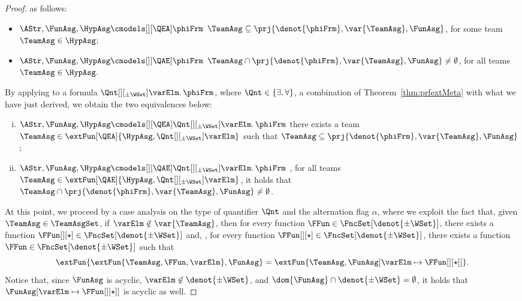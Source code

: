 \documentclass[authoryear]{elsarticle}
\newcommand{\EmpTeamAsg}{\emptyset}
\begin{document}
\begin{proof}
  as follows:
  \begin{itemize}[$\bullet$]
  \item
    $\AStr, \FunAsg, \HypAsg \cmodels[][\QEA] \phiFrm$ \iff $\TeamAsg \subseteq
    \prj{\denot{\phiFrm}, \var{\TeamAsg}, \FunAsg}$, for
    some team $\TeamAsg \in \HypAsg$;
  \item
    $\AStr, \FunAsg, \HypAsg \cmodels[][\QAE] \phiFrm$ \iff $\TeamAsg \cap
    \prj{\denot{\phiFrm}, \var{\TeamAsg}, \FunAsg} \neq
    \EmpTeamAsg$, for all teams $\TeamAsg \in \HypAsg$.
  \end{itemize}
%
    By applying to a formula $\Qnt[][_{\pm\WSet}] \varElm \ldotp \phiFrm$, where
    $\Qnt \in \{ \exists, \forall \}$, a combination of
    Theorem~\ref{thm:prfextMeta} with what we have just derived, we obtain the
    two equivalences below:
  \begin{enumerate}[i)]
  \item\label{thm:qntint(qnt:ea)}
    $\AStr, \FunAsg, \HypAsg \cmodels[][\QEA] \Qnt[][_{\pm\WSet}] \varElm \ldotp
    \phiFrm$ \iff there exists a team $\TeamAsg \in \extFun[\QEA]{\HypAsg,
      \Qnt[][_{\pm\WSet}] \varElm}$ such that $\TeamAsg \subseteq
    \prj{\denot{\phiFrm}, \var{\TeamAsg}, \FunAsg}$;
  \item\label{thm:qntint(qnt:ae)}
    $\AStr, \FunAsg, \HypAsg \cmodels[][\QAE] \Qnt[][_{\pm\WSet}] \varElm \ldotp
    \phiFrm$ \iff, for all teams $\TeamAsg \in \extFun[\QAE]{\HypAsg,
      \Qnt[][_{\pm\WSet}] \varElm}$, it holds that $\TeamAsg \cap
    \prj{\denot{\phiFrm}, \var{\TeamAsg}, \FunAsg} \neq \EmpTeamAsg$.
  \end{enumerate}
%
  At this point, we proceed by a case analysis on the type of quantifier $\Qnt$
  and the alternation flag $\alpha$, where we exploit the fact that, given
  $\TeamAsg \in \TeamAsgSet$,
%
%
  if
  $\varElm \notin \var{\TeamAsg}$, then for every function $\FFun \in
  \FncSet[\denot{\pm\WSet}]{}$, there exists a function $\FFun[][\star] \in
  \FncSet[\denot{\pm\WSet}]{}$ and, \viceversa, for every function
  $\FFun[][\star] \in \FncSet[\denot{\pm\WSet}]{}$, there exists a function
  $\FFun \in \FncSet[\denot{\pm\WSet}]{}$ such that
  \[
    \extFun{\extFun{\TeamAsg, \FFun, \varElm}, \FunAsg} = \extFun{\TeamAsg,
    {\FunAsg}[\varElm \mapsto \FFun[][\star]]}.
  \]
  Notice that, since $\FunAsg$ is acyclic, $\varElm \not\in \denot{\pm\WSet}$,
  and $\dom{\FunAsg} \cap \denot{\pm\WSet} = \emptyset$, it holds that
  ${\FunAsg}[\varElm \mapsto \FFun[][\star]]$ is acyclic as well.


\end{proof}
\end{document}
